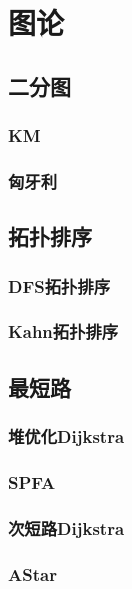 \documentclass{ctexart}
\begin{document}
\section{图论}
\subsection{二分图}
\subsubsection{KM}

\subsubsection{匈牙利}

\subsection{拓扑排序}
\subsubsection{DFS拓扑排序}

\subsubsection{Kahn拓扑排序}

\subsection{最短路}
\subsubsection{堆优化Dijkstra}

\subsubsection{SPFA}

\subsubsection{次短路Dijkstra}

\subsubsection{AStar}

\end{document}
